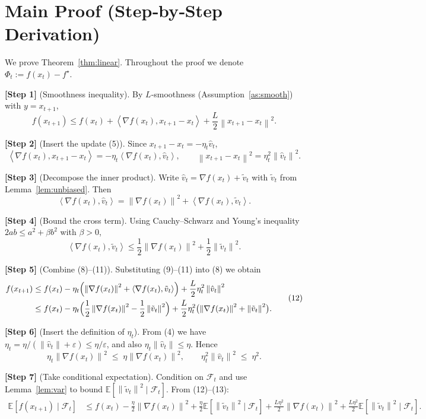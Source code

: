 \documentclass{article}
\newcommand{\E}{\mathbb{E}}
\newcommand{\norm}[1]{\left\lVert #1\right\rVert}
\newcommand{\inner}[2]{\left\langle #1,#2\right\rangle}
\begin{document}
\section*{Main Proof (Step‑by‑Step Derivation)}
We prove Theorem~\ref{thm:linear}.  Throughout the proof we denote
$\Phi_t:=f(x_t)-f^\star$.

\noindent\textbf{[Step 1]} (Smoothness inequality).  
By $L$‑smoothness (Assumption~\ref{as:smooth}) with $y=x_{t+1}$,
\[
f(x_{t+1})\le f(x_t)+\inner{\nabla f(x_t)}{x_{t+1}-x_t}
+\frac{L}{2}\norm{x_{t+1}-x_t}^2 .
\tag{8}
\]

\noindent\textbf{[Step 2]} (Insert the update (5)).  
Since $x_{t+1}-x_t=-\eta_t\hat v_t$,
\[
\inner{\nabla f(x_t)}{x_{t+1}-x_t}
=-\eta_t\inner{\nabla f(x_t)}{\hat v_t},
\qquad
\norm{x_{t+1}-x_t}^2=\eta_t^2\norm{\hat v_t}^2 .
\tag{9}
\]

\noindent\textbf{[Step 3]} (Decompose the inner product).  
Write $\hat v_t=\nabla f(x_t)+\tilde v_t$ with $\tilde v_t$ from Lemma~\ref{lem:unbiased}.
Then
\[
\inner{\nabla f(x_t)}{\hat v_t}
=\norm{\nabla f(x_t)}^2+\inner{\nabla f(x_t)}{\tilde v_t}.
\tag{10}
\]

\noindent\textbf{[Step 4]} (Bound the cross term).  
Using Cauchy–Schwarz and Young’s inequality
$2ab\le a^2+\beta b^2$ with $\beta>0$,
\[
\inner{\nabla f(x_t)}{\tilde v_t}
\le\frac{1}{2}\norm{\nabla f(x_t)}^2
+\frac{1}{2}\norm{\tilde v_t}^2 .
\tag{11}
\]

\noindent\textbf{[Step 5]} (Combine (8)–(11)).  
Substituting (9)–(11) into (8) we obtain
\[
\begin{aligned}
f(x_{t+1})
&\le f(x_t)-\eta_t\Bigl(\norm{\nabla f(x_t)}^2
+\inner{\nabla f(x_t)}{\tilde v_t}\Bigr)
+\frac{L}{2}\eta_t^2\norm{\hat v_t}^2 \\
&\le f(x_t)-\eta_t\Bigl(\frac{1}{2}\norm{\nabla f(x_t)}^2
-\frac{1}{2}\norm{\tilde v_t}^2\Bigr)
+\frac{L}{2}\eta_t^2\bigl(\norm{\nabla f(x_t)}^2+\norm{\tilde v_t}^2\bigr).
\end{aligned}
\tag{12}
\]

\noindent\textbf{[Step 6]} (Insert the definition of $\eta_t$).  
From (4) we have $\eta_t=\eta/(\norm{\hat v_t}+\varepsilon)\le\eta/\varepsilon$,
and also $\eta_t\norm{\hat v_t}\le\eta$.  Hence
\[
\eta_t\norm{\nabla f(x_t)}^2\;\le\;\eta\norm{\nabla f(x_t)}^2,
\qquad
\eta_t^2\norm{\hat v_t}^2\;\le\;\eta^2 .
\tag{13}
\]

\noindent\textbf{[Step 7]} (Take conditional expectation).  
Condition on $\mathcal{F}_t$ and use Lemma~\ref{lem:var} to bound
$\E[\norm{\tilde v_t}^2\mid\mathcal{F}_t]$.
From (12)–(13):
\[
\begin{aligned}
\E[f(x_{t+1})\mid\mathcal{F}_t]
&\le f(x_t)
-\frac{\eta}{2}\norm{\nabla f(x_t)}^2
+\frac{\eta}{2}\E[\norm{\tilde v_t}^2\mid\mathcal{F}_t]
+\frac{L\eta^2}{2}\norm{\nabla f(x_t)}^2
+\frac{L\eta^2}{2}\E[\norm{\tilde v_t}^2\mid\mathcal{F}_t] .
\end{aligned}
\tag{14}
\]
\end{document}
